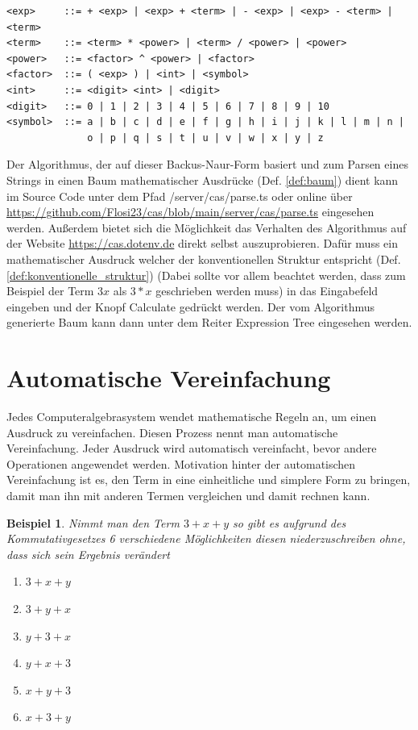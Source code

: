 \documentclass[11pt]{article}
\newcommand{\lab}[1]{(Def. \ref{#1})}
\newtheorem{example}{Beispiel}
\begin{document}
\begin{verbatim}
<exp>     ::= + <exp> | <exp> + <term> | - <exp> | <exp> - <term> | <term> 
<term>    ::= <term> * <power> | <term> / <power> | <power>
<power>   ::= <factor> ^ <power> | <factor>
<factor>  ::= ( <exp> ) | <int> | <symbol> 
<int>     ::= <digit> <int> | <digit>
<digit>   ::= 0 | 1 | 2 | 3 | 4 | 5 | 6 | 7 | 8 | 9 | 10
<symbol>  ::= a | b | c | d | e | f | g | h | i | j | k | l | m | n | 
              o | p | q | s | t | u | v | w | x | y | z
\end{verbatim}

Der Algorithmus, der auf dieser Backus-Naur-Form basiert und zum Parsen eines Strings in einen
Baum mathematischer Ausdrücke \lab{def:baum} dient kann im Source Code unter dem Pfad /server/cas/parse.ts 
oder online über \url{https://github.com/Flosi23/cas/blob/main/server/cas/parse.ts} eingesehen werden. \newline
Außerdem bietet sich die Möglichkeit das Verhalten des Algorithmus auf der Website  \url{https://cas.dotenv.de}
direkt selbst auszuprobieren. Dafür muss ein mathematischer Ausdruck welcher der konventionellen Struktur 
entspricht \lab{def:konventionelle_struktur}
(Dabei sollte vor allem beachtet werden, dass zum Beispiel der Term $3x$ als $3*x$ geschrieben werden muss)
in das Eingabefeld eingeben und der Knopf \glqq Calculate\grqq{}  gedrückt werden. 
Der vom Algorithmus generierte Baum kann dann unter dem Reiter \glqq Expression Tree\grqq{} eingesehen werden.

\section{Automatische Vereinfachung}

Jedes Computeralgebrasystem wendet mathematische Regeln an, um einen Ausdruck zu vereinfachen. 
Diesen Prozess nennt man automatische Vereinfachung. 
Jeder Ausdruck wird automatisch vereinfacht, bevor andere Operationen angewendet werden. 
Motivation hinter der automatischen Vereinfachung ist es, den Term in eine einheitliche und simplere Form zu bringen, 
damit man ihn mit anderen Termen vergleichen und damit rechnen kann. 

\begin{example}
Nimmt man den Term $3+x+y$ so gibt es aufgrund des Kommutativgesetzes 6 verschiedene Möglichkeiten diesen
niederzuschreiben ohne, dass sich sein Ergebnis verändert
\begin{enumerate}
  \item $3+x+y$
  \item $3+y+x$
  \item $y+3+x$
  \item $y+x+3$
  \item $x+y+3$
  \item $x+3+y$
\end{enumerate}
\end{example}
\end{document}

